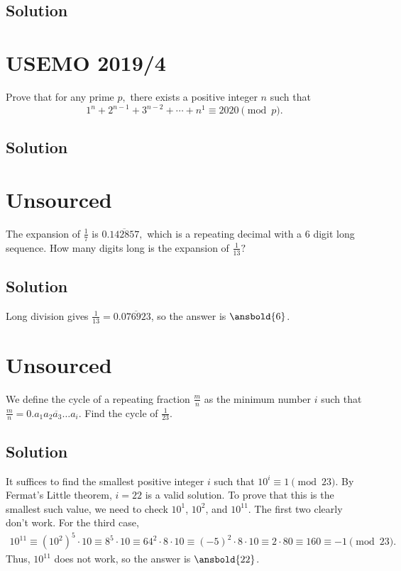 \documentclass[mast]{lucky}
\begin{document}
\subsection{Solution}

\pagebreak\section{USEMO 2019/4}

Prove that for any prime $p,$ there exists a positive integer $n$ such that
\[1^n+2^{n-1}+3^{n-2}+\cdots+n^1\equiv 2020\pmod{p}.\]

\subsection{Solution}

\pagebreak\section{Unsourced}

The expansion of $\frac{1}{7}$ is $0.\overline{142857},$ which is a repeating decimal with a $6$ digit long sequence. How many digits long is the expansion of $\frac{1}{13}?$

\subsection{Solution}

Long division gives $\frac{1}{13} = 0.\overline{076923}$, so the answer is $\ansbold{6}$.

\pagebreak\section{Unsourced}

We define the cycle of a repeating fraction $\tfrac{m}{n}$ as the minimum number $i$ such that $\tfrac{m}{n} = 0.\overline{a_1a_2a_3\dots a_i}$. Find the cycle of $\tfrac{1}{23}$.

\subsection{Solution}

It suffices to find the smallest positive integer $i$ such that $10^i \equiv 1 \pmod{23}$. By Fermat's Little theorem, $i = 22$ is a valid solution. To prove that this is the smallest such value, we need to check $10^1$, $10^2$, and $10^{11}$. The first two clearly don't work. For the third case,
\begin{align*}
10^{11} \equiv (10^2)^5 \cdot 10 \equiv 8^5 \cdot 10 \equiv 64^2 \cdot 8 \cdot 10 \equiv (-5)^2 \cdot 8 \cdot 10 \equiv 2 \cdot 80 \equiv 160 \equiv -1 \pmod{23}.
\end{align*}
Thus, $10^{11}$ does not work, so the answer is $\ansbold{22}$.
\end{document}
